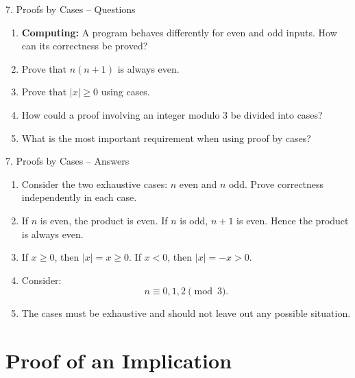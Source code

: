 \documentclass[aspectratio=169,11pt]{beamer}
\begin{document}
\begin{frame}{7. Proofs by Cases -- Questions}

\begin{enumerate}
\item \textbf{Computing:} A program behaves differently for even and odd inputs. How can its correctness be proved?

\item Prove that $n(n+1)$ is always even.

\item Prove that $|x|\geq0$ using cases.

\item How could a proof involving an integer modulo 3 be divided into cases?

\item What is the most important requirement when using proof by cases?
\end{enumerate}

\end{frame}

\begin{frame}{7. Proofs by Cases -- Answers}

\begin{enumerate}
\item Consider the two exhaustive cases: $n$ even and $n$ odd. Prove correctness independently in each case.

\item If $n$ is even, the product is even. If $n$ is odd, $n+1$ is even. Hence the product is always even.

\item If $x\geq0$, then $|x|=x\geq0$. If $x<0$, then $|x|=-x>0$.

\item Consider:
\[
n\equiv0,1,2\pmod3.
\]

\item The cases must be exhaustive and should not leave out any possible situation.
\end{enumerate}

\end{frame}


\section{Proof of an Implication}
\end{document}
